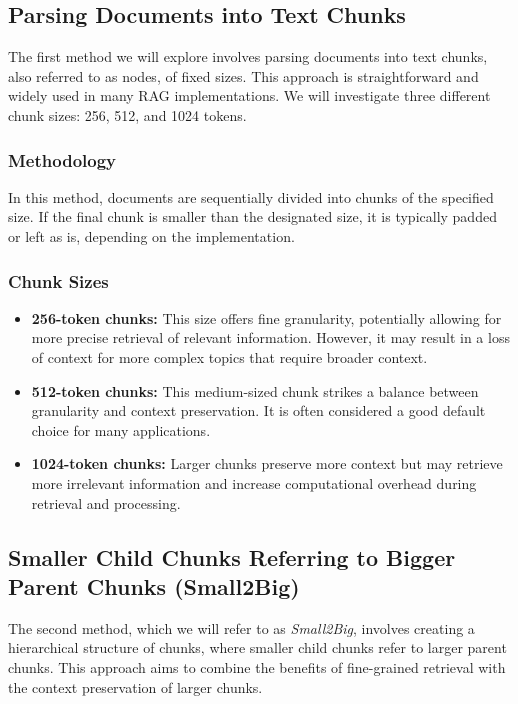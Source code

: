 \subsection{Parsing Documents into Text Chunks}\label{subsec:parsing-documents-into-text-chunks}
The first method we will explore involves parsing documents into text chunks, also referred to as nodes, of fixed sizes.
This approach is straightforward and widely used in many RAG implementations.
We will investigate three different chunk sizes: 256, 512, and 1024 tokens.
\subsubsection{Methodology}
In this method, documents are sequentially divided into chunks of the specified size.
If the final chunk is smaller than the designated size, it is typically padded or left as is, depending on the implementation.
\subsubsection{Chunk Sizes}
\begin{itemize}
    \item \textbf{256-token chunks:} This size offers fine granularity, potentially allowing for more precise retrieval of relevant information. However, it may result in a loss of context for more complex topics that require broader context.
    \item \textbf{512-token chunks:} This medium-sized chunk strikes a balance between granularity and context preservation. It is often considered a good default choice for many applications.
    \item \textbf{1024-token chunks:} Larger chunks preserve more context but may retrieve more irrelevant information and increase computational overhead during retrieval and processing.
\end{itemize}

\subsection{Smaller Child Chunks Referring to Bigger Parent Chunks (Small2Big)}\label{subsec:smaller-child-chunks-referring-to-bigger-parent-chunks}
The second method, which we will refer to as \textit{Small2Big}, involves creating a hierarchical structure of chunks, where smaller child chunks refer to larger parent chunks.
This approach aims to combine the benefits of fine-grained retrieval with the context preservation of larger chunks.
